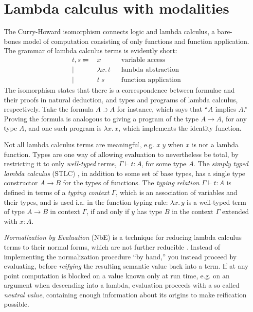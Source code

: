 \documentclass[12pt,twoside,openright]{report}
\numberwithin{equation}{chapter}
\numberwithin{figure}{chapter}
\numberwithin{table}{chapter}
\theoremstyle{definition}\newtheorem{definition}{Definition}
\begin{document}
\section{Lambda calculus with modalities}

The Curry-Howard isomorphism \cite{howard80} connects logic and lambda calculus,
a bare-bones model of computation
consisting of only functions and function application.
The grammar of lambda calculus terms is evidently short:
\begin{align*}
  t, s \Coloneqq& \, x &&\text{variable access} \\
  \mid& \, \lambda x.\, t &&\text{lambda abstraction} \\
  \mid& \, t \; s &&\text{function application}
\end{align*}
The isomorphism states that there is a correspondence between
formulae and their proofs in natural deduction,
and types and programs of lambda calculus, respectively.
Take the formula $A \supset A$ for instance,
which says that ``$A$ implies $A$.''
Proving the formula is analogous to giving a program of the type $A \to A$,
for any type $A$,
and one such program is $\lambda x.\, x$,
which implements the identity function.

Not all lambda calculus terms are meaningful,
e.g. $x \; y$ when $x$ is not a lambda function.
Types are one way of allowing evaluation to nevertheless be total,
by restricting it to only \emph{well-typed} terms,
$\Gamma \vdash t : A$, for some type $A$.
The \emph{simply typed lambda calculus} (STLC) \cite{church40},
in addition to some set of base types,
has a single type constructor $A \to B$ for the types of functions.
The \emph{typing relation} $\Gamma \vdash t : A$ is defined
in terms of a \emph{typing context} $\Gamma$,
which is an association of variables and their types,
and is used i.a. in the function typing rule:
$\lambda x.\, y$ is a well-typed term of type $A \to B$ in context $\Gamma$,
if and only if $y$ has type $B$ in the context $\Gamma$ extended with $x : A$.

\emph{Normalization by Evaluation} (NbE) is a technique for
reducing lambda calculus terms to their normal forms,
which are not further reducible \cite{berger91}.
Instead of implementing the normalization procedure ``by hand,''
you instead proceed by evaluating,
before \emph{reifying} the resulting semantic value back into a term.
If at any point computation is blocked on a value known only at run time,
e.g. on an argument when descending into a lambda,
evaluation proceeds with a so called \emph{neutral value},
containing enough information about its origins to make reification possible.
\end{document}
